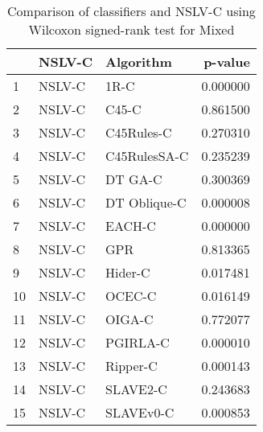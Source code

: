 \begin{table}
\footnotesize
\caption{Comparison of classifiers and NSLV-C using Wilcoxon signed-rank test for Mixed}
\label{tab:NSLV-C wilcoxon Mixed comparison}
\begin{tabular}{lllr}
\hline
 & NSLV-C & Algorithm & p-value \\
\hline
1 & NSLV-C & 1R-C & 0.000000 \\
2 & NSLV-C & C45-C & 0.861500 \\
3 & NSLV-C & C45Rules-C & 0.270310 \\
4 & NSLV-C & C45RulesSA-C & 0.235239 \\
5 & NSLV-C & DT GA-C & 0.300369 \\
6 & NSLV-C & DT Oblique-C & 0.000008 \\
7 & NSLV-C & EACH-C & 0.000000 \\
8 & NSLV-C & GPR & 0.813365 \\
9 & NSLV-C & Hider-C & 0.017481 \\
10 & NSLV-C & OCEC-C & 0.016149 \\
11 & NSLV-C & OIGA-C & 0.772077 \\
12 & NSLV-C & PGIRLA-C & 0.000010 \\
13 & NSLV-C & Ripper-C & 0.000143 \\
14 & NSLV-C & SLAVE2-C & 0.243683 \\
15 & NSLV-C & SLAVEv0-C & 0.000853 \\
\hline
\end{tabular}
\end{table}
